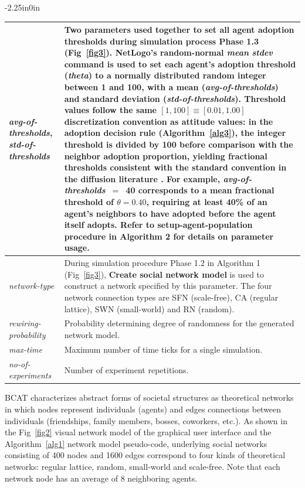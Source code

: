 \documentclass[10pt,letterpaper]{article}
\begin{document}
\begin{table}[!ht]
\begin{adjustwidth}{-2.25in}{0in}
\begin{tabularx}{\linewidth}{|l|X|}
\textit{avg-of-thresholds}, \textit{std-of-thresholds} & Two parameters used together to set all agent adoption thresholds during simulation process Phase 1.3 (Fig~\ref{fig3}). NetLogo's \textbf{random-normal \textit{mean} \textit{stdev}} command is used to set each agent's adoption threshold (\textit{theta}) to a normally distributed random integer between 1 and 100, with a mean (\textit{avg-of-thresholds}) and standard deviation (\textit{std-of-thresholds}). Threshold values follow the same $[1, 100] \equiv [0.01, 1.00]$ discretization convention as attitude values: in the adoption decision rule (Algorithm~\ref{alg3}), the integer threshold is divided by 100 before comparison with the neighbor adoption proportion, yielding fractional thresholds consistent with the standard convention in the diffusion literature \cite{Watts2004,Valente1996}. For example, \textit{avg-of-thresholds}~$=$~40 corresponds to a mean fractional threshold of $\theta = 0.40$, requiring at least 40\% of an agent's neighbors to have adopted before the agent itself adopts. Refer to \textbf{setup-agent-population} procedure in Algorithm 2 for details on parameter usage. \\ \hline
\textit{network-type} & During simulation procedure Phase 1.2 in Algorithm 1 (Fig~\ref{fig3}), \textbf{Create social network model} is used to construct a network specified by this parameter. The four network connection types are SFN (scale-free), CA (regular lattice), SWN (small-world) and RN (random). \\ \hline
\textit{rewiring-probability} & Probability determining degree of randomness for the generated network model. \\ \hline
\textit{max-time} & Maximum number of time ticks for a single simulation. \\ \hline
\textit{no-of-experiments} & Number of experiment repetitions. \\ \hline
\end{tabularx}
\end{adjustwidth}
\end{table}

BCAT characterizes abstract forms of societal structures as theoretical networks in which nodes represent individuals (agents) and edges connections between individuals (friendships, family members, bosses, coworkers, etc.). As shown in the Fig~\ref{fig2} visual network model of the graphical user interface and the Algorithm~\ref{alg1} network model pseudo-code, underlying social networks consisting of 400 nodes and 1600 edges correspond to four kinds of theoretical networks: regular lattice, random, small-world and scale-free. Note that each network node has an average of 8 neighboring agents.
\end{document}
